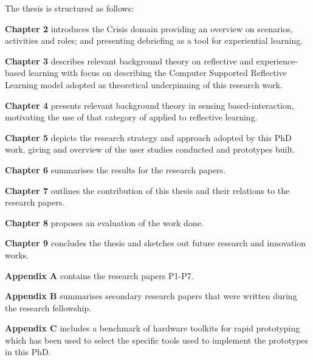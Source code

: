 The thesis is structured as follows:

\textbf{Chapter 2} introduces the Crisis domain providing an overview on scenarios, activities and roles; and presenting debriefing as a tool for experiential learning.

\textbf{Chapter 3} describes relevant background theory on reflective and experience-based learning with focus on describing the Computer Supported Reflective Learning model adopted as theoretical underpinning of this research work.

\textbf{Chapter 4} presents relevant background theory in sensing based-interaction, motivating the use of that category of applied to reflective learning.

\textbf{Chapter 5} depicts the research strategy and approach adopted by this PhD work, giving and overview of the user studies conducted and prototypes built.

\textbf{Chapter 6} summarises the results for the research papers.

\textbf{Chapter 7} outlines the contribution of this thesis and their relations to the research papers.

\textbf{Chapter 8} proposes an evaluation of the work done.

\textbf{Chapter 9} concludes the thesis and sketches out future research and innovation works.

\textbf{Appendix A} contains the research papers P1-P7.

\textbf{Appendix B} summarises secondary research papers that were written during the research fellowship.

\textbf{Appendix C} includes a benchmark of hardware toolkits for rapid prototyping which has been used to select the specific tools used to implement the prototypes in this PhD. 
